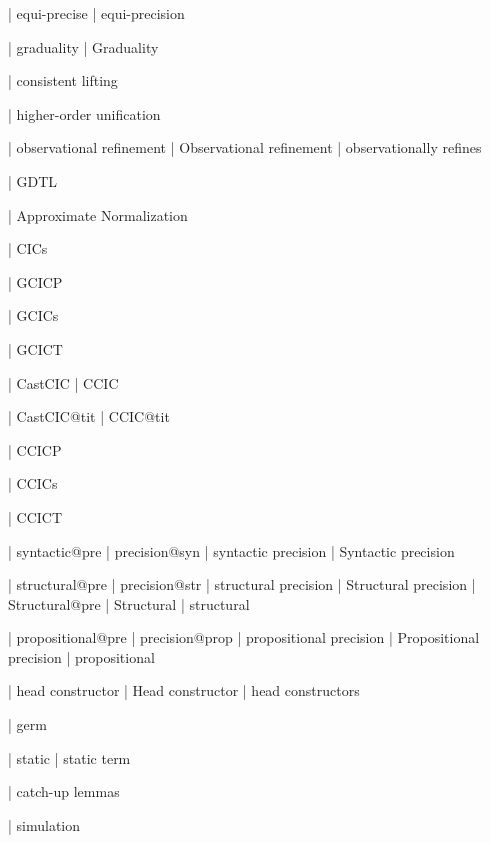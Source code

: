   | equi-precise
  | equi-precision

  | graduality
  | Graduality

  | consistent lifting

  | higher-order unification

  | observational refinement
  | Observational refinement
  | observationally refines

  | GDTL

  | Approximate Normalization

  | CICs

  | GCICP

  | GCICs

  | GCICT

  | CastCIC
  | CCIC

  | CastCIC@tit
  | CCIC@tit

  | CCICP

  | CCICs

  | CCICT

  | syntactic@pre
  | precision@syn
  | syntactic precision
  | Syntactic precision

  | structural@pre
  | precision@str
  | structural precision
  | Structural precision
  | Structural@pre
  | Structural
  | structural

  | propositional@pre
  | precision@prop
  | propositional precision
  | Propositional precision
  | propositional


 | head constructor
 | Head constructor
 | head constructors

  | germ

  | static
  | static term

  | catch-up lemmas

  | simulation

